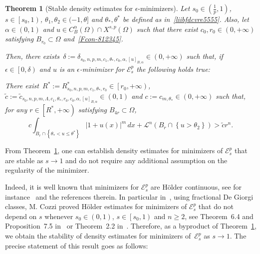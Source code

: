 \documentclass[12pt]{article}
\numberwithin{equation}{section}
\newtheorem{thm}{Theorem}[section]
\renewcommand{\leq}{\leqslant}
\renewcommand{\geq}{\geqslant}
\begin{document}
\begin{thm}[Stable density estimates for $\epsilon$-minimizers]\label{CapVieABall}
Let $s_0\in \left(\frac{1}{p},1\right)$, $s\in \left[s_0,1\right)$, $\theta_1,\theta_2\in (-1,\theta]$ and $\theta_*,\theta^*$ be defined as in~\eqref{liibfdcvre5555}. Also, let $\alpha\in (0,1)$ and $u\in C_B^\alpha(\Omega)\cap X^{s,p}(\Omega)$ such that there exist $c_0,r_0\in (0,+\infty)$ satisfying $B_{r_0}\subset\Omega$ and~\eqref{Fcon-812345}.

  
Then, there exists~$\delta:=\delta_{s_0,n,p,m,c_1,\theta_*,c_0,\alpha,\left[u\right]_{B,\alpha}}\in (0,+\infty)$ such that, if $\epsilon\in \left[0,\delta\right)$ and $u$ is an $\epsilon$-minimizer for $\mathcal{E}_s^p$ the following holds true:

There exist~$R^{*}:= R_{s_0,n,p,m,c_1,\theta_*,r_0}^{*}\in \left[r_0,+\infty\right)$, $\tilde{c}:=\tilde{c}_{s_0,n,p,m,\Lambda, c_1,\theta_*,r_0,c_0,\alpha,\left[u\right]_{B,\alpha}}\in (0,1)$ and $c:=c_{m,\theta_*}\in (0,+\infty)$ such that, for any $r\in \left[R^*,+\infty\right)$ satisfying $B_{4r}\subset \Omega$,
\begin{equation}\label{benz.1}
c\int_{B_r\cap \left\lbrace \theta_{*}<u\leq \theta^* \right\rbrace}\left|1+u(x)\right|^m\,dx+\mathcal{L}^n(B_r\cap \left\lbrace u>\theta_2 \right\rbrace)>\tilde{c}r^n.
\end{equation}
\end{thm}

From Theorem~\ref{CapVieABall}, one can establish density estimates for minimizers of $\mathcal{E}_s^p$ that are stable as $s\to 1$ and do not require any additional assumption on the regularity of the minimizer. 

Indeed, it is well known that minimizers for $\mathcal{E}_s^p$ are H\"older continuous, see for instance~\cite{MR3593528,MR3861716,MR3630640} and the references therein. In particular in~\cite{MR3630640}, using fractional De Giorgi classes, M. Cozzi proved H\"older estimates for minimizers of $\mathcal{E}_s^p$ that do not depend on $s$ whenever $s_0\in \left(0,1\right)$, $s\in \left[s_0,1\right)$ and $n\geq 2$, see Theorem~6.4 and Proposition~7.5 in~\cite{MR3630640} or Theorem~2.2 in~\cite{DFVERPP}. Therefore, as a byproduct of Theorem~\ref{CapVieABall}, we obtain the stability of density estimates for minimizers of~$\mathcal{E}_s^p$ as $s\to 1$. The precise statement of this result goes as follows:  
\end{document}
